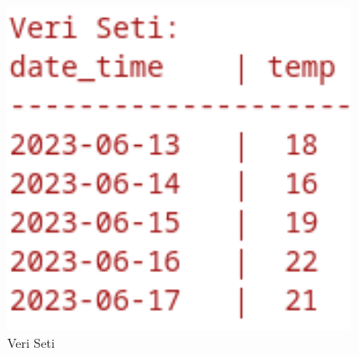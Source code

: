 \documentclass[12pt,a4paper]{article}
\begin{document}
\begin{enumerate}
\begin{itemize}
\begin{itemize}
\begin{figure}[h]
    \centering
    \includegraphics[width=0.9\textwidth,height=0.2\textheight,keepaspectratio]{veriseti.png}
    \caption{Veri Seti}
    

\end{figure}
\end{itemize}
\end{itemize}
\end{enumerate}
\end{document}
